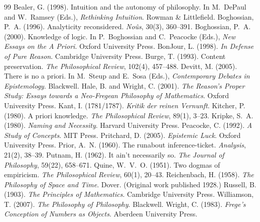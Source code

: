 \documentclass{situationist-preprint}
\begin{document}
\begin{thebibliography}{99}\small
{} Bealer, G. (1998). Intuition and the autonomy of philosophy. In M.~DePaul and W.~Ramsey (Eds.), \emph{Rethinking Intuition}. Rowman \& Littlefield.
 Boghossian, P.~A. (1996). Analyticity reconsidered. \emph{No\^us}, 30(3), 360--391.
 Boghossian, P.~A. (2000). Knowledge of logic. In P.~Boghossian and C.~Peacocke (Eds.), \emph{New Essays on the A Priori}. Oxford University Press.
 BonJour, L. (1998). \emph{In Defense of Pure Reason}. Cambridge University Press.
 Burge, T. (1993). Content preservation. \emph{The Philosophical Review}, 102(4), 457--488.
 Devitt, M. (2005). There is no a priori. In M.~Steup and E.~Sosa (Eds.), \emph{Contemporary Debates in Epistemology}. Blackwell.
 Hale, B. and Wright, C. (2001). \emph{The Reason's Proper Study: Essays towards a Neo-Fregean Philosophy of Mathematics}. Oxford University Press.
 Kant, I. (1781/1787). \emph{Kritik der reinen Vernunft}.
 Kitcher, P. (1980). A priori knowledge. \emph{The Philosophical Review}, 89(1), 3--23.
 Kripke, S.~A. (1980). \emph{Naming and Necessity}. Harvard University Press.
 Peacocke, C. (1992). \emph{A Study of Concepts}. MIT Press.
 Pritchard, D. (2005). \emph{Epistemic Luck}. Oxford University Press.
 Prior, A.~N. (1960). The runabout inference-ticket. \emph{Analysis}, 21(2), 38--39.
 Putnam, H. (1962). It ain't necessarily so. \emph{The Journal of Philosophy}, 59(22), 658--671.
 Quine, W.~V.~O. (1951). Two dogmas of empiricism. \emph{The Philosophical Review}, 60(1), 20--43.
 Reichenbach, H. (1958). \emph{The Philosophy of Space and Time}. Dover. (Original work published 1928.)
 Russell, B. (1903). \emph{The Principles of Mathematics}. Cambridge University Press.
 Williamson, T. (2007). \emph{The Philosophy of Philosophy}. Blackwell.
 Wright, C. (1983). \emph{Frege's Conception of Numbers as Objects}. Aberdeen University Press.
\end{thebibliography}
\end{document}
